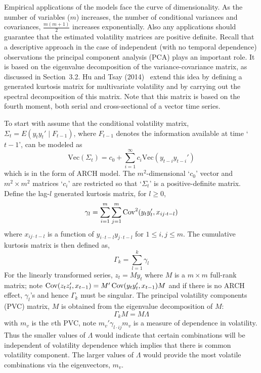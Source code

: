 Empirical applications of the models face the curve of dimensionality. As the number of variables ($m$) increases, the number of conditional variances and covariances, $\frac{m(m+1)}{2}$ increases exponentially. Also any applications should guarantee that the estimated volatility matrices are positive definite. Recall that a descriptive approach in the case of independent (with no temporal dependence) observations the principal component analysis (PCA) plays an important role. It is based on the eigenvalue decomposition of the variance-covariance matrix, as discussed in Section~3.2. Hu and Tsay (2014)~\cite{hutsay14} extend this idea by defining a generated kurtosis matrix for multivariate volatility and by carrying out the spectral decomposition of this matrix. Note that this matrix is based on the fourth moment, both serial and cross-sectional of a vector time series.


To start with assume that the conditional volatility matrix, $\Sigma_t=E(y_ty_t' \;|\; F_{t-1})$, where $F_{t-1}$ denotes the information available at time `$t-1$', can be modeled as
	\begin{equation}\label{eqn:vtmodel}
	\text{Vec}(\Sigma_t)= c_0 + \sum_{i=1}^\infty c_i \text{Vec}(y_{t-i} y_{t-i}')
	\end{equation}
which is in the form of ARCH model. The $m^2$-dimensional `$c_0$' vector and $m^2 \times m^2$ matrices `$c_i$' are restricted so that `$\Sigma_t$' is a positive-definite matrix. Define the lag-$l$ generated kurtosis matrix, for $l \geq 0$,
	\begin{equation}\label{eqn:kurtosismat}
	\gamma_l = \sum_{i=1}^m \sum_{j=1}^m \Cov^2(y_t y_t', x_{ij \cdot t - l} )
	\end{equation}
where $x_{ij \cdot t - l}$ is a function of $y_{i \cdot t-l} y_{j \cdot t-l}$ for $1 \leq i,j \leq m$. The cumulative kurtosis matrix is then defined as,
	\begin{equation}\label{eqn:cumkurt}
	\Gamma_k=\sum_{l=1}^k \gamma_l
	\end{equation}
For the linearly transformed series, $z_t=My_t$ where $M$ is a $m \times m$ full-rank matrix; note $\operatorname{Cov}(z_tz_t', x_{t-1})=M' \operatorname{Cov}(y_ty_t', x_{t-1})M$ and if there is no ARCH effect, $\gamma_l$'s and hence $\Gamma_k$ must be singular. The principal volatility components (PVC) matrix, $M$ is obtained from the eigenvalue decomposition of $M$:
	\begin{equation}\label{eqn:obtainM}
	\Gamma_kM= M \Lambda
	\end{equation}
with $m_v$ is the $v$th PVC, note $m_v'\gamma_{l \cdot ij} m_v$ is a measure of dependence in volatility. Thus the smaller values of $\Lambda$ would indicate that certain combinations will be independent of volatility dependence which implies that there is common volatility component. The larger values of $\Lambda$ would provide the most volatile combinations via the eigenvectors, $m_v$. 


